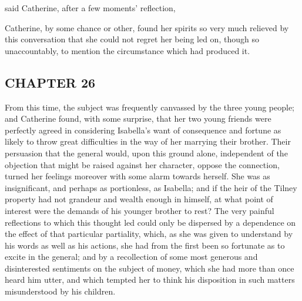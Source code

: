  said Catherine, after a few moments' reflection, 


Catherine, by some chance or other, found her spirits so very much relieved by this conversation that she could not regret her being led on, though so unaccountably, to mention the circumstance which had produced it.

\subsection[chapter-26]{\useURL[url28][][][]\from[url28]CHAPTER 26}

From this time, the subject was frequently canvassed by the three young people; and Catherine found, with some surprise, that her two young friends were perfectly agreed in considering Isabella's want of consequence and fortune as likely to throw great difficulties in the way of her marrying their brother. Their persuasion that the general would, upon this ground alone, independent of the objection that might be raised against her character, oppose the connection, turned her feelings moreover with some alarm towards herself. She was as insignificant, and perhaps as portionless, as Isabella; and if the heir of the Tilney property had not grandeur and wealth enough in himself, at what point of interest were the demands of his younger brother to rest? The very painful reflections to which this thought led could only be dispersed by a dependence on the effect of that particular partiality, which, as she was given to understand by his words as well as his actions, she had from the first been so fortunate as to excite in the general; and by a recollection of some most generous and disinterested sentiments on the subject of money, which she had more than once heard him utter, and which tempted her to think his disposition in such matters misunderstood by his children.

